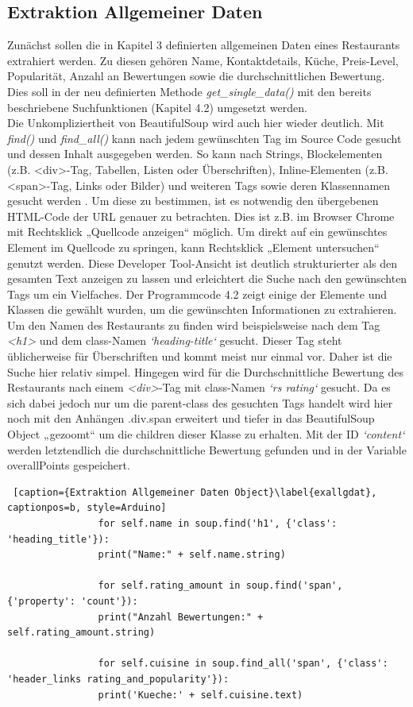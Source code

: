 \documentclass[a4paper,oneside,12pt]{report}
\begin{document}
			\subsection[Extraktion Allgemeiner Daten - Anja Wolf]{Extraktion Allgemeiner Daten}			
				Zunächst sollen die in Kapitel 3 definierten allgemeinen Daten eines Restaurants extrahiert werden. Zu diesen gehören Name, Kontaktdetails, Küche, Preis-Level, Popularität, Anzahl an Bewertungen sowie die durchschnittlichen Bewertung. Dies soll in der neu definierten Methode \textit{get\_single\_data()}  mit den bereits beschriebene Suchfunktionen (Kapitel 4.2) umgesetzt werden.
				\\ 
				Die Unkompliziertheit von BeautifulSoup wird auch hier wieder deutlich. Mit \textit{find()} und \textit{find\_all()} kann nach jedem gewünschten Tag im Source Code gesucht und dessen Inhalt ausgegeben werden. So kann nach Strings, Blockelementen (z.B. <div>-Tag, Tabellen, Listen oder Überschriften), Inline-Elementen (z.B. <span>-Tag, Links oder Bilder) und weiteren Tags sowie deren Klassennamen gesucht werden \cite{bib-bs4}.
				Um diese zu bestimmen, ist es notwendig den übergebenen HTML-Code der URL genauer zu betrachten. Dies ist z.B. im Browser Chrome mit Rechtsklick „Quellcode anzeigen“ möglich. Um direkt auf ein gewünschtes Element im Quellcode zu springen, kann Rechtsklick „Element untersuchen“ genutzt werden. Diese Developer Tool-Ansicht ist deutlich strukturierter als den gesamten Text anzeigen zu lassen und erleichtert die Suche nach den gewünschten Tags um ein Vielfaches.
				\newline
				Der Programmcode 4.2 zeigt einige der Elemente und Klassen die gewählt wurden, um die gewünschten Informationen zu extrahieren.
				Um den Namen des Restaurants zu finden wird beispielsweise nach dem Tag \textit{<h1>} und dem class-Namen \textit{‘heading-title‘} gesucht. Dieser Tag steht üblicherweise für Überschriften und kommt meist nur einmal vor. Daher ist die Suche hier relativ simpel. Hingegen wird für die Durchschnittliche Bewertung des Restaurants nach einem \textit{<div>}-Tag mit class-Namen \textit{‘rs rating‘} gesucht. Da es sich dabei jedoch nur um die parent-class des gesuchten Tags handelt wird hier noch mit den Anhängen .div.span erweitert und tiefer in das BeautifulSoup Object „gezoomt“ um die children dieser Klasse zu erhalten. Mit der ID \textit{‘content‘} werden letztendlich die durchschnittliche Bewertung gefunden und in der Variable overallPoints gespeichert.
				\\
				\begin{lstlisting} [caption={Extraktion Allgemeiner Daten Object}\label{exallgdat}, captionpos=b, style=Arduino]
				for self.name in soup.find('h1', {'class': 'heading_title'}):
				print("Name:" + self.name.string)
				
				for self.rating_amount in soup.find('span', {'property': 'count'}):
				print("Anzahl Bewertungen:" + self.rating_amount.string)
				
				for self.cuisine in soup.find_all('span', {'class': 'header_links rating_and_popularity'}):
				print('Kueche:' + self.cuisine.text)
				\end{lstlisting}
				
\end{document}
